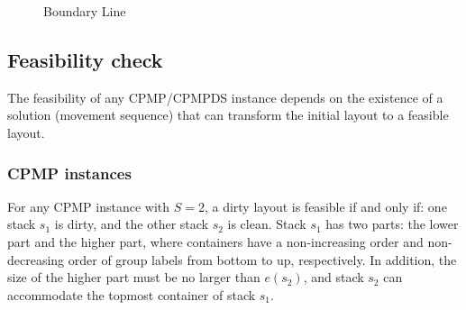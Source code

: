 \documentclass[review,3p,times,authoryear,12pt]{elsarticle}
\begin{document}
\begin{figure}[htbp]
\centering
{}
\caption{Boundary Line}
\label{fig4}
\end{figure}


\subsection{Feasibility check}

The feasibility of any CPMP/CPMPDS instance depends on the existence of a solution (movement sequence) that can transform the initial layout to a feasible layout.

\subsubsection{CPMP instances}

For any CPMP instance with $S=2$, a dirty layout is feasible if and only if: one stack $s_1$ is dirty, and the other stack $s_2$ is clean.
Stack $s_1$ has two parts: the lower part and the higher part, where containers have a non-increasing order and non-decreasing order of group labels from bottom to up, respectively. 
In addition, the size of the higher part must be no larger than $e(s_2)$, and stack $s_2$ can accommodate the topmost container of stack $s_1$.
\end{document}
